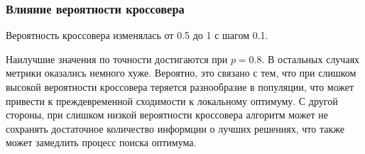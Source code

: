 \documentclass[12pt,a4paper]{article}
\begin{document}
\subsubsection{Влияние вероятности кроссовера}
Вероятность кроссовера изменялась от 0.5 до 1 с шагом 0.1.

\begin{table}[H]
    \centering
    \caption{Исследование влияния вероятности кроссовера.}
    \label{tab:crossover_prob}
\end{table}

Наилучшие значения по точности достигаются при \(p = 0.8\). В остальных случаях метрики оказались немного хуже.
Вероятно, это связано с тем, что при слишком высокой вероятности кроссовера теряется разнообразие в популяции,
что может привести к преждевременной сходимости к локальному оптимуму.
С другой стороны, при слишком низкой вероятности кроссовера алгоритм может не сохранять достаточное количество
информции о лучших решениях, что также может замедлить процесс поиска оптимума.
\end{document}
